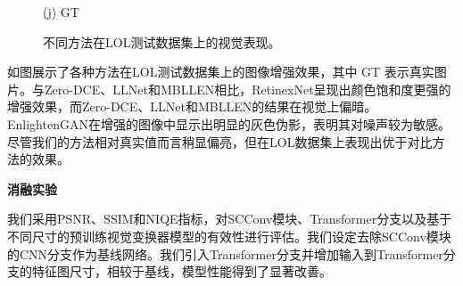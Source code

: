 \documentclass[CJK,aspectratio=169]{beamer}  %
\begin{document}
\begin{frame}
\begin{figure}
\begin{minipage}{0.19\textwidth}
			\caption*{\tiny (j) GT}
			\label{fig: GT}	
		\end{minipage}
		\captionsetup{font=scriptsize}
		\caption{
			\label{fig: LOL}
			\small 不同方法在LOL测试数据集上的视觉表现。
		}
	\end{figure}
	
	\vspace{-0.3cm}
	
	{ \yahei 如图展示了各种方法在LOL测试数据集上的图像增强效果，其中 GT 表示真实图片。与Zero-DCE、LLNet和MBLLEN相比，RetinexNet呈现出颜色饱和度更强的增强效果，而Zero-DCE、LLNet和MBLLEN的结果在视觉上偏暗。EnlightenGAN在增强的图像中显示出明显的灰色伪影，表明其对噪声较为敏感。尽管我们的方法相对真实值而言稍显偏亮，但在LOL数据集上表现出优于对比方法的效果。}
	
	\end{frame}
	
	\begin{frame}
		{ \yahei \textbf{消融实验}}
		
		{ \yahei 我们采用PSNR、SSIM和NIQE指标，对SCConv模块、Transformer分支以及基于不同尺寸的预训练视觉变换器模型的有效性进行评估。我们设定去除SCConv模块的CNN分支作为基线网络。我们引入Transformer分支并增加输入到Transformer分支的特征图尺寸，相较于基线，模型性能得到了显著改善。}
		
		\begin{table}[!htbp]
			\centering
			\tiny
			\captionsetup{font=scriptsize} %
			\caption{
				\label{tab: Ablation Study}
				\small Transformer分支和Transformer预训练权重尺寸和SCConv对模型的影响。
			} 
		\end{table}
		
	\end{frame}
	
\end{document}
